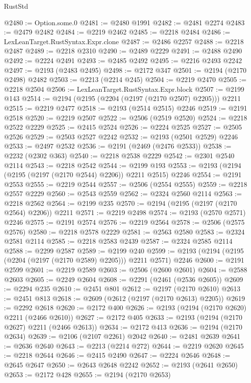 \begin{lexlean}{RustStd}
\begin{coremodule}
@2480 := Option.some.{0}
@2481 := @2480 @1991
@2482 := @2481 @2274
@2483 := @2479 @2482
@2484 := @2219 @2462
@2485 := @2218 @2484
@2486 := LexLeanTarget.RustSyntax.Expr.clone
@2487 := @2486 @2257
@2488 := @2218 @2487
@2489 := @2218 @2310
@2490 := @2489 @2229
@2491 := @2488 @2490
@2492 := @2224 @2491
@2493 := @2485 @2492
@2495 := @2216 @2493 @2242
@2497 := @2193 (@2483 @2495)
@2498 := @2172 @347
@2501 := @2194 (@2170 @2498) @2482
@2503 := @2213 (@2214 @245)
@2504 := @2219 @2470
@2505 := @2218 @2504
@2506 := LexLeanTarget.RustSyntax.Expr.block
@2507 := @2199 @143
@2514 := @2194 (@2195 (@2204 (@2197 (@2170 @2507) @2205))) @2211
@2515 := @2219 @2477
@2518 := @2193 (@2514 @2515) @2246
@2519 := @2191 @2518
@2520 := @2219 @2507
@2522 := @2506 (@2519 @2520)
@2524 := @2218 @2522 @2229
@2525 := @2415 @2524
@2526 := @2224 @2525
@2527 := @2505 @2526
@2529 := @2503 @2527 @2242
@2532 := @2193 (@2501 @2529) @2246
@2533 := @2497 @2532
@2536 := @2191 (@2469 (@2476 @2533))
@2538 := @2232 (@2302 @363)
@2540 := @2218 @2538 @2229
@2542 := @2301 @2540 @2114
@2543 := @2218 @2542
@2544 := @2199 @193
@2553 := @2193 (@2194 (@2195 (@2197 (@2170 @2544) @2206)) @2211 @2515) @2246
@2554 := @2191 @2553
@2555 := @2219 @2544
@2557 := @2506 (@2554 @2555)
@2559 := @2218 @2557 @2229
@2560 := @2543 @2559
@2562 := @2324 @2560 @2114
@2563 := @2218 @2562
@2564 := @2199 @235
@2570 := @2194 (@2195 (@2197 (@2170 @2564) @2206)) @2211
@2571 := @2219 @2498
@2574 := @2193 (@2570 @2571) @2246
@2575 := @2191 @2574
@2576 := @2219 @2564
@2578 := @2506 (@2575 @2576)
@2580 := @2218 @2578 @2229
@2581 := @2563 @2580
@2583 := @2324 @2581 @2114
@2585 := @2218 @2583 @2439
@2587 := @2324 @2585 @2114
@2588 := @2299 @2587
@2589 := @2199 @240
@2599 := @2193 (@2194 (@2195 (@2204 (@2197 (@2170 @2589) @2205))) @2211 @2571) @2246
@2600 := @2191 @2599
@2601 := @2219 @2589
@2603 := @2506 (@2600 @2601)
@2604 := @2588 @2603
@2605 := @2249 @2604
@2608 := @2291 (@2461 (@2536 @2605))
@2609 := @2294 @235
@2610 := @2451 @801
@2612 := @2197 (@2170 @2610)
@2613 := @2451 @813
@2618 := @2609 (@2612 (@2197 (@2170 @2613) @2205))
@2619 := @2292 @2618
@2620 := @2172 @400
@2626 := @2193 (@2194 (@2170 @2620) @2211 (@2466 @2610))
@2627 := @2172 @405
@2633 := @2193 (@2194 (@2170 @2627) @2211 (@2466 @2613))
@2634 := @2172 @413
@2636 := @2194 (@2170 @2634)
@2639 := @2106 (@2107 @2261) @2042
@2640 := @2481 @2639
@2641 := @2636 @2640
@2643 := @2213 (@2214 @272)
@2644 := @2219 @2620
@2645 := @2218 @2644
@2646 := @2415 @2490
@2647 := @2224 @2646
@2648 := @2645 @2647
@2650 := @2643 @2648 @2242
@2652 := @2193 (@2641 @2650)
@2653 := @2172 @428
@2655 := @2194 (@2170 @2653)

\end{coremodule}
\end{lexlean}
